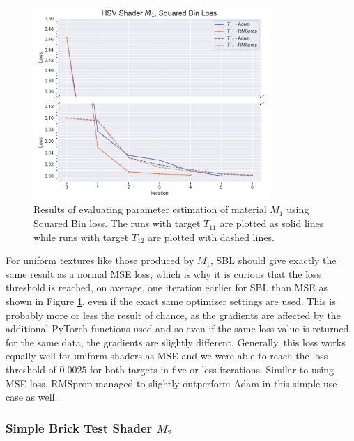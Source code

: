 \begin{figure}[hpt]
    \centering
    \includegraphics[width=0.8\textwidth]{img/evaluation/M1/HSV_SBL.pdf}
    \caption{Results of evaluating parameter estimation of material $M_1$ using Squared Bin loss. The runs with target $T_{11}$ are plotted as solid lines while runs with target $T_{12}$ are plotted with dashed lines.}
    \label{fig:M1SBLData}
\end{figure}

For uniform textures like those produced by $M_1$, SBL should give exactly the same result as a normal MSE loss, which is why it is curious that the loss threshold is reached, on average, one iteration earlier for SBL than MSE as shown in Figure \ref{fig:M1SBLData}, even if the exact same optimizer settings are used. This is probably more or less the result of chance, as the gradients are affected by the additional PyTorch functions used and so even if the same loss value is returned for the same data, the gradients are slightly different. Generally, this loss works equally well for uniform shaders as MSE and we were able to reach the loss threshold of $0.0025$ for both targets in five or less iterations. Similar to using MSE loss, RMSprop managed to slightly outperform Adam in this simple use case as well.

\subsubsection{Simple Brick Test Shader $M_2$}

